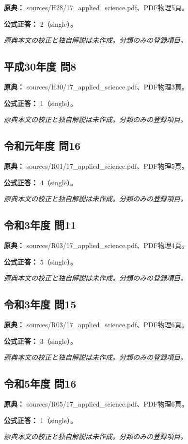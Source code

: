 \noindent\textbf{原典：} sources/H28/17\_applied\_science.pdf、PDF物理5頁。

\textbf{公式正答：} 2（single）。

\par\textit{原典本文の校正と独自解説は未作成。分類のみの登録項目。}

\subsection{平成30年度 問8}
\label{q:h30-reg-applied-08}

\noindent\textbf{原典：} sources/H30/17\_applied\_science.pdf、PDF物理3頁。

\textbf{公式正答：} 1（single）。

\par\textit{原典本文の校正と独自解説は未作成。分類のみの登録項目。}

\subsection{令和元年度 問16}
\label{q:r01-reg-applied-16}

\noindent\textbf{原典：} sources/R01/17\_applied\_science.pdf、PDF物理5頁。

\textbf{公式正答：} 4（single）。

\par\textit{原典本文の校正と独自解説は未作成。分類のみの登録項目。}

\subsection{令和3年度 問11}
\label{q:r03-reg-applied-11}

\noindent\textbf{原典：} sources/R03/17\_applied\_science.pdf、PDF物理4頁。

\textbf{公式正答：} 5（single）。

\par\textit{原典本文の校正と独自解説は未作成。分類のみの登録項目。}

\subsection{令和3年度 問15}
\label{q:r03-reg-applied-15}

\noindent\textbf{原典：} sources/R03/17\_applied\_science.pdf、PDF物理6頁。

\textbf{公式正答：} 3（single）。

\par\textit{原典本文の校正と独自解説は未作成。分類のみの登録項目。}

\subsection{令和5年度 問16}
\label{q:r05-reg-applied-16}

\noindent\textbf{原典：} sources/R05/17\_applied\_science.pdf、PDF物理6頁。

\textbf{公式正答：} 1（single）。

\par\textit{原典本文の校正と独自解説は未作成。分類のみの登録項目。}
